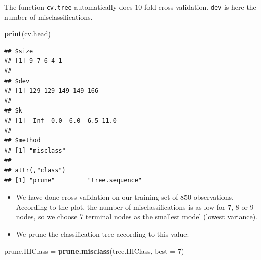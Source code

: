 \documentclass[10pt,ignorenonframetext,]{beamer}
\newenvironment{Shaded}{\begin{snugshade}}{\end{snugshade}}
\newcommand{\KeywordTok}[1]{\textcolor[rgb]{0.13,0.29,0.53}{\textbf{#1}}}
\newcommand{\DataTypeTok}[1]{\textcolor[rgb]{0.13,0.29,0.53}{#1}}
\newcommand{\DecValTok}[1]{\textcolor[rgb]{0.00,0.00,0.81}{#1}}
\newcommand{\StringTok}[1]{\textcolor[rgb]{0.31,0.60,0.02}{#1}}
\newcommand{\NormalTok}[1]{#1}
\begin{document}
\begin{frame}[fragile]

The function \texttt{cv.tree} automatically does \(10\)-fold
cross-validation. \texttt{dev} is here the number of misclassifications.

\scriptsize

\begin{Shaded}
\begin{Highlighting}[]
\KeywordTok{print}\NormalTok{(cv.head)}
\end{Highlighting}
\end{Shaded}

\begin{verbatim}
## $size
## [1] 9 7 6 4 1
## 
## $dev
## [1] 129 129 149 149 166
## 
## $k
## [1] -Inf  0.0  6.0  6.5 11.0
## 
## $method
## [1] "misclass"
## 
## attr(,"class")
## [1] "prune"         "tree.sequence"
\end{verbatim}

\end{frame}

\begin{frame}[fragile]

\begin{itemize}
\item
  We have done cross-validation on our training set of 850 observations.
  According to the plot, the number of misclassifications is as low for
  7, 8 or 9 nodes, so we choose 7 terminal nodes as the smallest model
  (lowest variance).
\item
  We prune the classification tree according to this value:
\end{itemize}

\scriptsize

\begin{Shaded}
\begin{Highlighting}[]
\NormalTok{prune.HIClass =}\StringTok{ }\KeywordTok{prune.misclass}\NormalTok{(tree.HIClass, }\DataTypeTok{best =} \DecValTok{7}\NormalTok{)}
\end{Highlighting}
\end{Shaded}

\end{frame}
\end{document}
